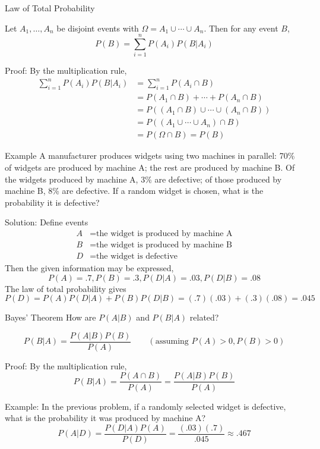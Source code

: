 \documentclass[xcolor=table]{beamer}
\begin{document}
\begin{frame}{Law of Total Probability}
\begin{block}{}
Let $A_1,\dots,A_n$ be disjoint events with $\Omega=A_1\cup\cdots\cup A_n$. Then for any event $B$,
$$P(B)=\sum_{i=1}^n P(A_i)P(B|A_i)$$
\end{block}

\pause Proof: By the multiplication rule, \begin{align*}
\sum_{i=1}^n P(A_i)P(B|A_i) &= 
\sum_{i=1}^n P(A_i \cap B) \\
&= P(A_1\cap B)+\cdots+P(A_n\cap B)\\
&= P((A_1\cap B)\cup\cdots\cup (A_n\cap B)) \\
&= P((A_1 \cup \cdots \cup A_n) \cap B) \\
&= P(\Omega \cap B) = P(B)
\end{align*}
\end{frame}

\begin{frame}{Example}
A manufacturer produces widgets using two machines in parallel: 70\% of widgets are produced by machine A; the rest are produced by machine B. Of the widgets produced by machine A, 3\% are defective; of those produced by machine B, 8\% are defective. If a random widget is chosen, what is the probability it is defective?

\pause\vspace{.3cm}
Solution: Define events
\begin{align*}
A &= \text{the widget is produced by machine A} \\
B &= \text{the widget is produced by machine B} \\
D &= \text{the widget is defective}
\end{align*}
Then the given information may be expressed,
$$P(A)=.7, P(B)=.3, P(D|A)=.03, P(D|B)=.08$$
\pause The law of total probability gives
$$P(D) = P(A)P(D|A)+P(B)P(D|B) = (.7)(.03)+(.3)(.08) = .045$$
\end{frame}

\begin{frame}{Bayes' Theorem}
How are $P(A|B)$ and $P(B|A)$ related?
\pause\begin{block}{}
\vspace{-.2cm}$$P(B|A) = \frac{P(A|B)P(B)}{P(A)} \quad\quad (\text{assuming $P(A)>0, P(B)>0$})$$
\end{block}
\pause Proof: By the multiplication rule,
$$P(B|A) = \frac{P(A \cap B)}{P(A)} = \frac{P(A|B)P(B)}{P(A)}$$

\pause Example: In the previous problem, if a randomly selected widget is defective, what is the probability it was produced by machine A?
\pause $$P(A|D) = \frac{P(D|A)P(A)}{P(D)} = \frac{(.03)(.7)}{.045}\approx .467$$
\end{frame}
\end{document}
